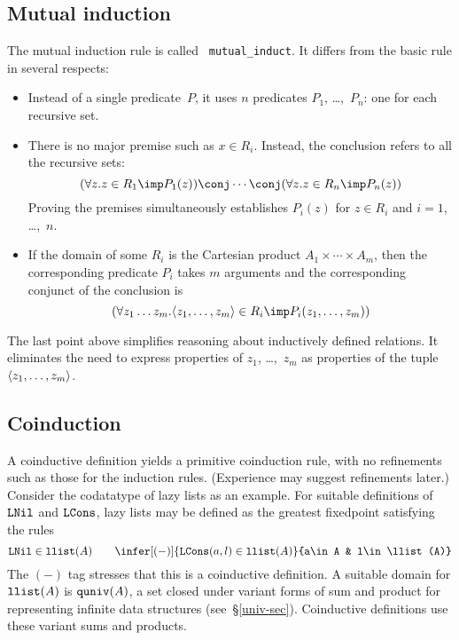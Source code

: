 \subsection{Mutual induction}
The mutual induction rule is called {\tt
mutual\_induct}.  It differs from the basic rule in several respects:
\begin{itemize}
\item Instead of a single predicate~$P$, it uses $n$ predicates $P_1$,
\ldots,~$P_n$: one for each recursive set.

\item There is no major premise such as $x\in R_i$.  Instead, the conclusion
refers to all the recursive sets:
\[ (\forall z.z\in R_1\imp P_1(z))\conj\cdots\conj
   (\forall z.z\in R_n\imp P_n(z))
\]
Proving the premises simultaneously establishes $P_i(z)$ for $z\in
R_i$ and $i=1$, \ldots,~$n$.

\item If the domain of some $R_i$ is the Cartesian product
$A_1\times\cdots\times A_m$, then the corresponding predicate $P_i$ takes $m$
arguments and the corresponding conjunct of the conclusion is
\[ (\forall z_1\ldots z_m.\pair{z_1,\ldots,z_m}\in R_i\imp P_i(z_1,\ldots,z_m))
\]
\end{itemize}
The last point above simplifies reasoning about inductively defined
relations.  It eliminates the need to express properties of $z_1$,
\ldots,~$z_m$ as properties of the tuple $\langle z_1,\ldots,z_m\rangle$.

\subsection{Coinduction}\label{coind-sec}
A coinductive definition yields a primitive coinduction rule, with no
refinements such as those for the induction rules.  (Experience may suggest
refinements later.)  Consider the codatatype of lazy lists as an example.  For
suitable definitions of ${\tt LNil}$ and ${\tt LCons}$, lazy lists may be defined as the
greatest fixedpoint satisfying the rules
\[  \LNil\in\llist(A)  \qquad 
    \infer[(-)]{\LCons(a,l)\in\llist(A)}{a\in A & l\in\llist(A)}
\]
The $(-)$ tag stresses that this is a coinductive definition.  A suitable
domain for ${\tt llist}(A)$ is ${\tt quniv}(A)$, a set closed under variant forms of
sum and product for representing infinite data structures
(see~\S\ref{univ-sec}).  Coinductive definitions use these variant sums and
products.

